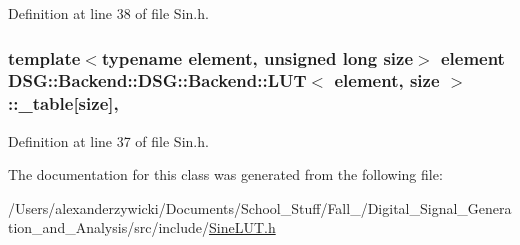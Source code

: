 Definition at line 38 of file Sin.\+h.

\hypertarget{classDSG_1_1Backend_1_1DSG_1_1Backend_1_1LUT_a427da4b7eccdfe25e3c1889a8c2fdea6}{
\subsubsection[{\+\_\+table}]{\setlength{\rightskip}{0pt plus 5cm}template$<$typename element, unsigned long size$>$ element {\bf D\+S\+G\+::\+Backend\+::\+D\+S\+G\+::\+Backend\+::\+L\+U\+T}$<$ element, size $>$\+::\+\_\+table\mbox{[}size\mbox{]}\hspace{0.3cm}{\ttfamily [protected]}, {\ttfamily [inherited]}}}\label{classDSG_1_1Backend_1_1DSG_1_1Backend_1_1LUT_a427da4b7eccdfe25e3c1889a8c2fdea6}


Definition at line 37 of file Sin.\+h.



The documentation for this class was generated from the following file\+:\begin{DoxyCompactItemize}
\item 
/\+Users/alexanderzywicki/\+Documents/\+School\+\_\+\+Stuff/\+Fall\+\_/\+Digital\+\_\+\+Signal\+\_\+\+Generation\+\_\+and\+\_\+\+Analysis/src/include/\hyperlink{SineLUT_8h}{Sine\+L\+U\+T.\+h}\end{DoxyCompactItemize}
